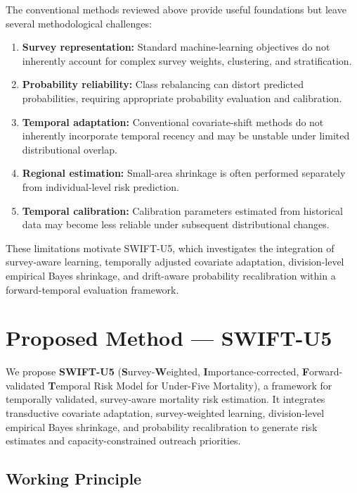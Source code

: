 \documentclass[a4paper,fleqn]{cas-sc}
\begin{document}
The conventional methods reviewed above provide useful foundations but leave several methodological challenges:

\begin{enumerate}
    \item \textbf{Survey representation:} Standard machine-learning objectives do not inherently account for complex survey weights, clustering, and stratification.
    \item \textbf{Probability reliability:} Class rebalancing can distort predicted probabilities, requiring appropriate probability evaluation and calibration.
    \item \textbf{Temporal adaptation:} Conventional covariate-shift methods do not inherently incorporate temporal recency and may be unstable under limited distributional overlap.
    \item \textbf{Regional estimation:} Small-area shrinkage is often performed separately from individual-level risk prediction.
    \item \textbf{Temporal calibration:} Calibration parameters estimated from historical data may become less reliable under subsequent distributional changes.
\end{enumerate}

These limitations motivate SWIFT-U5, which investigates the integration of survey-aware learning, temporally adjusted covariate adaptation, division-level empirical Bayes shrinkage, and drift-aware probability recalibration within a forward-temporal evaluation framework.



\section{Proposed Method --- SWIFT-U5}
\label{sec:proposed_method}

We propose \textbf{SWIFT-U5} (\textbf{S}urvey-\textbf{W}eighted, \textbf{I}mportance-corrected, \textbf{F}orward-validated \textbf{T}emporal Risk Model for Under-Five Mortality), a framework for temporally validated, survey-aware mortality risk estimation. It integrates transductive covariate adaptation, survey-weighted learning, division-level empirical Bayes shrinkage, and probability recalibration to generate risk estimates and capacity-constrained outreach priorities.

\subsection{Working Principle}
\label{sec:swift_working_principle}
\end{document}
